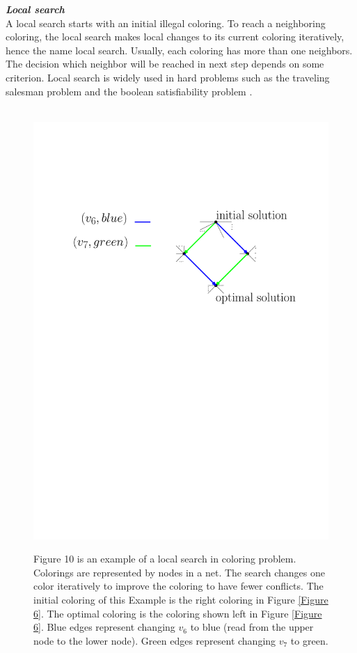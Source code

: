 \documentclass[12pt,a4paper,twoside]{scrartcl}
\numberwithin{equation}{section}
\begin{document}
\emph{\textbf{Local search}}\\
A local search starts with an initial illegal coloring. To reach a neighboring coloring, the local search makes local changes to its current coloring iteratively, hence the name local search. Usually, each coloring has more than one neighbors. The decision which neighbor will be reached in next step depends on some criterion. Local search is widely used in hard problems such as the traveling salesman problem \cite{stutzle1997max} and the boolean satisfiability problem \cite{zhang2004configuration}.

\begin{figure}[h!]
\centering
 \hbox{\hspace{12em} \includegraphics[scale = 0.6]{1/localsearch.pdf}}
 \caption{Figure 10 is an example of a local search in coloring problem. Colorings are represented by nodes in a net. The search changes one color iteratively to improve the coloring to have fewer conflicts. The initial coloring of this Example is the right coloring in Figure \ref{Figure 6}. The optimal coloring is the coloring shown left in Figure \ref{Figure 6}. Blue edges represent changing $v_6$ to blue (read from the upper node to the lower node). Green edges represent changing $v_7$ to green.}
\end{figure}
\end{document}
